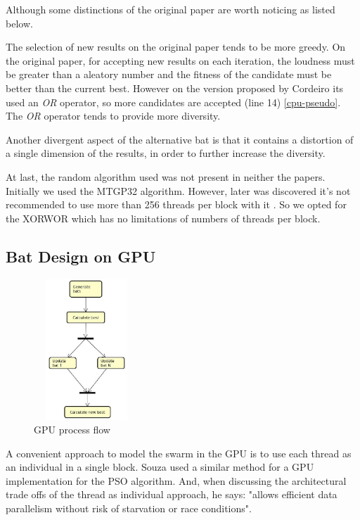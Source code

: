 \documentclass[conference]{IEEEtran}
\begin{document}
Although some distinctions of the original paper are worth noticing as listed below.

The selection of new results on the original paper tends to be more
greedy. On the original paper, for accepting new results on each
iteration, the loudness must be greater than a aleatory number and the
fitness of the candidate must be better than the current best.
However on the version proposed by Cordeiro \cite{comparisonBatParpinelli} its used
an \textit{OR} operator, so more candidates are accepted (line 14) \ref{cpu-pseudo}.
The \textit{OR} operator tends to provide more diversity.

Another divergent aspect of the alternative bat is that
it contains a distortion of a single dimension of the results, in order 
to further increase the diversity.

At last, the random algorithm used was not present in neither the
papers. Initially we used the MTGP32 algorithm. However, later was
discovered it's not recommended to use more than 256 threads per block
with it \cite{curandIssue}. So we opted for the XORWOR which has no
limitations of numbers of threads per block.


\subsection{Bat Design on GPU}

\begin{figure}[H]
    \begin{center}
    \includegraphics[width=150px,height=200px]{activity}
    \end{center}
    \caption{GPU process flow}
\end{figure}

A convenient approach to model the swarm in the GPU is to use each
thread as an individual in a single block. Souza \cite{pso-gpu} used a similar method for
a GPU implementation for the PSO algorithm. And, when discussing the
architectural trade offs of the thread as individual approach, he says:
"allows efficient data parallelism without risk of starvation or race
conditions".
\end{document}
